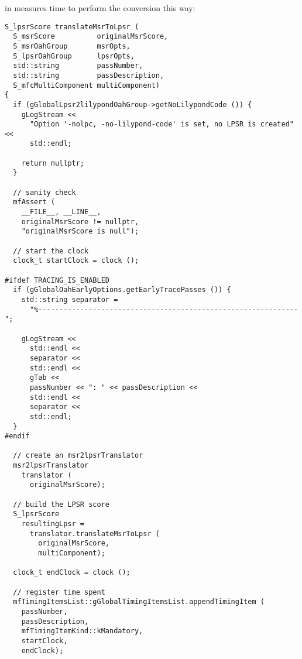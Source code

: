 \newpage

 in  measures time to perform the conversion this way:
\begin{lstlisting}[language=CPlusPlus]
S_lpsrScore translateMsrToLpsr (
  S_msrScore          originalMsrScore,
  S_msrOahGroup       msrOpts,
  S_lpsrOahGroup      lpsrOpts,
  std::string         passNumber,
  std::string         passDescription,
  S_mfcMultiComponent multiComponent)
{
  if (gGlobalLpsr2lilypondOahGroup->getNoLilypondCode ()) {
    gLogStream <<
      "Option '-nolpc, -no-lilypond-code' is set, no LPSR is created" <<
      std::endl;

    return nullptr;
  }

  // sanity check
  mfAssert (
    __FILE__, __LINE__,
    originalMsrScore != nullptr,
    "originalMsrScore is null");

  // start the clock
  clock_t startClock = clock ();

#ifdef TRACING_IS_ENABLED
  if (gGlobalOahEarlyOptions.getEarlyTracePasses ()) {
    std::string separator =
      "%--------------------------------------------------------------";

    gLogStream <<
      std::endl <<
      separator <<
      std::endl <<
      gTab <<
      passNumber << ": " << passDescription <<
      std::endl <<
      separator <<
      std::endl;
  }
#endif

  // create an msr2lpsrTranslator
  msr2lpsrTranslator
    translator (
      originalMsrScore);

  // build the LPSR score
  S_lpsrScore
    resultingLpsr =
      translator.translateMsrToLpsr (
        originalMsrScore,
        multiComponent);

  clock_t endClock = clock ();

  // register time spent
  mfTimingItemsList::gGlobalTimingItemsList.appendTimingItem (
    passNumber,
    passDescription,
    mfTimingItemKind::kMandatory,
    startClock,
    endClock);
\end{lstlisting}
